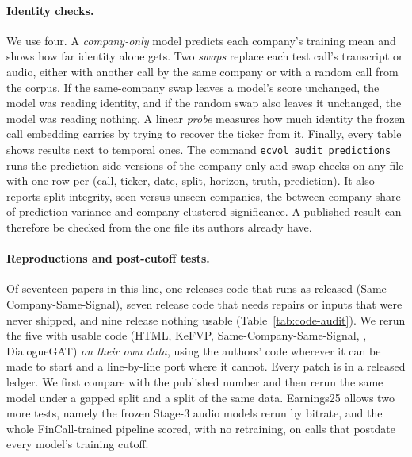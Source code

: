 \paragraph{Identity checks.}
\label{sec:controls}
We use four. A \emph{company-only} model predicts each company's training mean
and shows how far identity alone gets. Two \emph{swaps} replace each test call's
transcript or audio, either with another call by the same company or with a
random call from the corpus. If the same-company swap leaves a model's score
unchanged, the model was reading identity, and if the random swap also leaves it
unchanged, the model was reading nothing. A linear \emph{probe} measures how much
identity the frozen call embedding carries by trying to recover the ticker from
it. Finally, every table shows \tickerdisjoint{} results next to temporal ones.
The command
\texttt{ecvol audit predictions} runs the prediction-side versions of the
company-only and swap checks on any file with one row per (call, ticker, date,
split, horizon, truth, prediction). It also reports split integrity, seen versus
unseen companies, the between-company share of prediction variance and
company-clustered significance. A published result can therefore be checked from
the one file its authors already have.

\paragraph{Reproductions and post-cutoff tests.}
Of seventeen papers in this line, one releases code that runs as released
(Same-Company-Same-Signal), seven release code that needs repairs or inputs that
were never shipped, and nine release nothing usable (Table~\ref{tab:code-audit}).
We rerun the five with usable code (HTML, KeFVP, Same-Company-Same-Signal,
\citealp{sawhney2020mm}, DialogueGAT) \emph{on their own data}, using the authors'
code wherever it can be made to start and a line-by-line port where it cannot.
Every patch is in a released ledger. We first compare with the published number
and then rerun the same model under a gapped split and a \tickerdisjoint{} split
of the same data. Earnings25 allows two more tests, namely the frozen Stage-3
audio models rerun by bitrate, and the whole FinCall-trained pipeline scored,
with no retraining, on calls that postdate every model's training cutoff.
